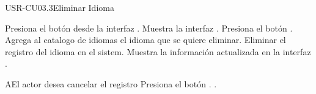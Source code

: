 \begin{UseCase}[]{USR-CU03.3}{Eliminar Idioma}{
}
\end{UseCase}

\begin{UCtrayectoria}
	\UCpaso [\UCactor] Presiona el botón \IUEliminar{} desde la interfaz .
    \UCpaso [\UCsist] Muestra la interfaz .
	\UCpaso [\UCactor] Presiona el botón .
	\UCpaso [\UCsist] Agrega al catalogo de idiomas el idioma que se quiere eliminar.
	\UCpaso [\UCsist] Eliminar el registro del idioma en el sistem.
	\UCpaso [\UCsist] Muestra la información actualizada en la interfaz .
\end{UCtrayectoria}

\begin{UCtrayectoriaA}{A}{El actor desea cancelar el registro}
	\UCpaso [\UCsist] Presiona el botón .
	.
\end{UCtrayectoriaA} 

